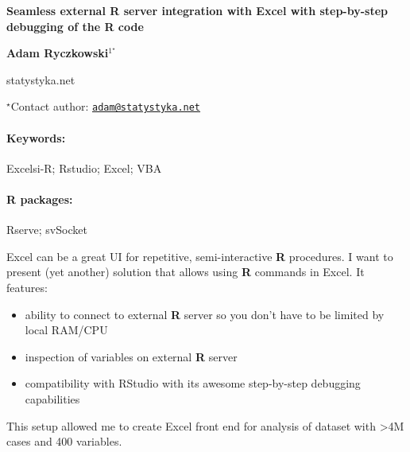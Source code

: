 \documentclass[11pt, a4paper]{article}
\renewcommand{\title}[1]{\begin{center}{\bf \LARGE #1}\end{center}}
\newcommand{\keywords}{\paragraph{Keywords:}}
\newcommand{\packages}{\paragraph{R packages:}}
\providecommand{\tightlist}{%
  \setlength{\itemsep}{0pt}\setlength{\parskip}{0pt}}
\begin{document}
\pagestyle{empty}

\title{Seamless external R server integration with Excel with step-by-step
debugging of the R code}

\begin{center}
  {\bf Adam Ryczkowski$^{1^\star}$}
\end{center}

\vskip 0.3cm

\begin{affiliations}
\begin{enumerate}
\begin{minipage}{0.915\textwidth}
\centering
\item statystyka.net \\[-2pt]
\end{minipage}
\end{enumerate}
$^\star$Contact author: \href{mailto:adam@statystyka.net}{\nolinkurl{adam@statystyka.net}}\\
\end{affiliations}

\vskip 0.5cm

\begin{minipage}{0.915\textwidth}
\keywords Excelsi-R; Rstudio; Excel; VBA
\packages Rserve; svSocket
\end{minipage}

\vskip 0.8cm

Excel can be a great UI for repetitive, semi-interactive \textbf{R}
procedures. I want to present (yet another) solution that allows using
\textbf{R} commands in Excel. It features:

\begin{itemize}
\tightlist
\item
  ability to connect to external \textbf{R} server so you don't have to
  be limited by local RAM/CPU
\item
  inspection of variables on external \textbf{R} server
\item
  compatibility with RStudio with its awesome step-by-step debugging
  capabilities
\end{itemize}

This setup allowed me to create Excel front end for analysis of dataset
with \textgreater{}4M cases and 400 variables.
\end{document}
